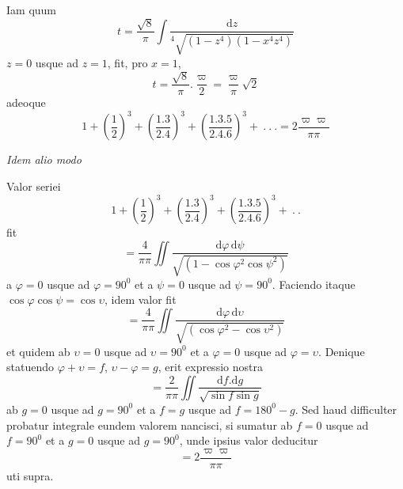 
Iam quum
\[
t=\frac{\surd 8}{\pi}\int\frac{\mathrm dz}{{}^{4}\!\surd{(1-z^4)(1-x^4z^4)}}
\]
$z=0$ usque ad $z=1$, fit, pro $x=1$,
\[
t=\frac{\surd 8}{\pi}.\frac{\varpi}{2}=\frac{\varpi}{\pi}\surd 2
\]
adeoque
\[
1+\left(\frac12\right)^3+\left(\frac{1.3}{2.4}\right)^3+
\left(\frac{1.3.5}{2.4.6}\right)^3+\ .\ .\ .=2\frac{\varpi\varpi}{\pi\pi}
\]
\begin{center}\textit{Idem alio modo}\end{center}
Valor seriei
\[
1+\left(\frac12\right)^3+\left(\frac{1.3}{2.4}\right)^3+
\left(\frac{1.3.5}{2.4.6}\right)^3+\ .\ .
\]
fit
\[
=\frac4{\pi\pi}\iint\frac{\mathrm d\varphi\,\mathrm d\psi}{\surd {(1-\cos\varphi^2\cos\psi^2)}}
\]
a $\varphi=0$ usque ad $\varphi=90^0$ et a $\psi=0$ usque ad $\psi=90^0$.
Faciendo itaque $\cos\varphi\cos\psi=\cos\upsilon$, idem valor fit
\[
=\frac4{\pi\pi}\iint\frac{\mathrm d\varphi\,\mathrm d\upsilon}{\surd {(\cos\varphi^2-\cos\upsilon^2)}}
\]
et quidem ab $\upsilon=0$ usque ad $\upsilon=90^0$ et a $\varphi=0$ usque ad $\varphi=\upsilon$.
Denique statuendo $\varphi+\upsilon=f$, $\upsilon-\varphi=g$, erit expressio nostra
\[
=\frac2{\pi\pi}\iint\frac{\mathrm df.\mathrm dg}{\surd {\sin f\sin g}}
\]
ab $g=0$ usque ad $g=90^0$ et a $f=g$ usque ad $f=180^0-g$.
Sed haud difficulter probatur integrale eundem valorem nancisci, si sumatur
ab $f=0$ usque ad $f=90^0$ et a $g=0$ usque ad $g=90^0$, unde ipsius valor deducitur
\[
=2\frac{\varpi\varpi}{\pi\pi}
\]
uti supra.

